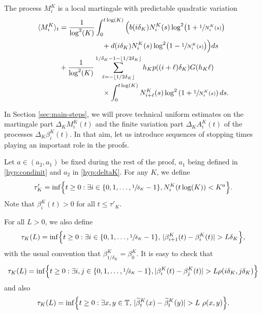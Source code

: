 \documentclass[10pt]{amsart}
\let\sep:
\theoremstyle{plain}
\theoremstyle{remark}
\newcommand\T{\mathbb{T}}
\begin{document}
The process $M^K_{i}$ is a local martingale with predictable quadratic variation
\begin{align}
\langle M^K_{i}\rangle_{t}& = \frac{1}{\log^2(K)}\int_{0}^{t\log(K)}\Big(b(i \delta_{K})N^K_{i}(s)\log^2\bigl(1+\sfrac{1}{N^K_{i}(s)}\bigr) \label{def:M}\\
& \qquad\qquad\qquad + d(i \delta_{K})N^K_{i}(s)\log^2\bigl(1-\sfrac{1}{N^K_{i}(s)}\bigr)\Big) ds \\
& +\frac{1}{\log^2(K)}\sum_{\ell=-\lfloor 1/2\delta_K\rfloor}^{1/\delta_K-1-\lfloor 1/2\delta_K\rfloor}
h_{K} p((i+\ell) \delta_{K}) G(h_{K}\ell)\\
& \qquad \qquad \qquad \times \int_{0}^{t\log(K)}N^K_{i+\ell}(s)\log^2\left(1+\sfrac{1}{N^K_{i}(s)}\right) ds.
\end{align}

In Section \ref{sec:main-steps}, we will prove technical uniform estimates on the martingale part $\Delta_K M^K_{i}(t)$ and the finite variation part $\Delta_K A^K_{i}(t)$ of the processes $\Delta_K\beta^K_{i}(t)$. In that aim, let us introduce sequences of stopping times playing an important role in the proofs.

Let $a\in(a_2,a_1)$ be fixed during the rest of the proof, $a_1$ being defined in \eqref{hyp:condinit} and $a_2$ in \eqref{hyp:deltaK}. For any $K$, we define
\begin{equation}
\label{theta}
\tau'_{K} = \inf\Bigl\{t\ge 0\sep \exists i \in \{0, 1,\dots, \sfrac{1}{\delta_K}-1\}, N^K_i(t\log(K)) < K^a\Bigr\}.
\end{equation}
Note that $\beta^K_{i}(t)>0$ for all $t\le\tau'_K$.

For all $L>0$, we also define
\begin{equation} \label{def:tau}
\tau_K(L)=\inf\Bigl\{t\geq 0\sep\exists i\in \{0, 1,\dots, \sfrac{1}{\delta_K}-1\},\,|\beta^K_{i+1}(t)-\beta^K_i(t)|>L\delta_K \Bigr\},
\end{equation}with the usual convention that $\beta^K_{1/\delta_K}=\beta^K_0$.
It is easy to check that
\[
\tau_K(L)=\inf\Bigl\{t\geq 0:\exists i,j\in \{0, 1,\dots, \sfrac{1}{\delta_K}-1\},
|\beta^K_{i}(t)-\beta^K_j(t)|>L\rho(i\delta_K,j\delta_K) \Bigr\}
\]
and also
\begin{equation} \label{def:tau2}
\tau_K(L)=\inf\Bigl\{t\geq 0:\exists x,y\in \T,\,|\widetilde{\beta}^K_{t}(x)-\widetilde{\beta}^K_t(y)|>L\ \rho(x,y) \Bigr\}.
\end{equation}
\end{document}
